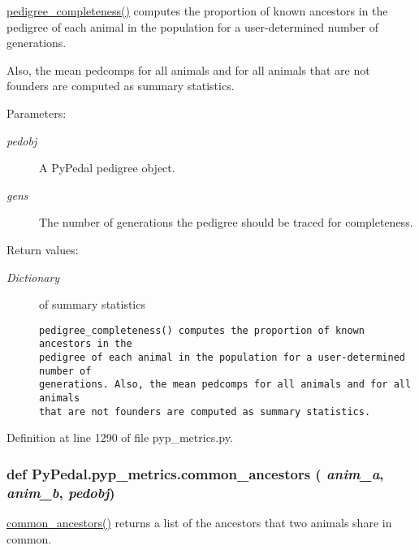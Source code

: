 \hyperlink{namespacePyPedal_1_1pyp__metrics_9839b790d3161aaf080c649adcdaff26}{pedigree\_\-completeness()} computes the proportion of known ancestors in the pedigree of each animal in the population for a user-determined number of generations. 

Also, the mean pedcomps for all animals and for all animals that are not founders are computed as summary statistics. \begin{Desc}
\item[Parameters:]
\begin{description}
\item[{\em pedobj}]A Py\-Pedal pedigree object. \item[{\em gens}]The number of generations the pedigree should be traced for completeness. \end{description}
\end{Desc}
\begin{Desc}
\item[Return values:]
\begin{description}
\item[{\em Dictionary}]of summary statistics

\footnotesize\begin{verbatim}pedigree_completeness() computes the proportion of known ancestors in the
pedigree of each animal in the population for a user-determined number of
generations. Also, the mean pedcomps for all animals and for all animals
that are not founders are computed as summary statistics.
\end{verbatim}
\normalsize
 \end{description}
\end{Desc}


Definition at line 1290 of file pyp\_\-metrics.py.\hypertarget{namespacePyPedal_1_1pyp__metrics_43a82ce2cfd34b53ddf6d29c4671d480}{
\subsubsection[common\_\-ancestors]{\setlength{\rightskip}{0pt plus 5cm}def Py\-Pedal.pyp\_\-metrics.common\_\-ancestors ( {\em anim\_\-a},  {\em anim\_\-b},  {\em pedobj})}}
\label{namespacePyPedal_1_1pyp__metrics_43a82ce2cfd34b53ddf6d29c4671d480}


\hyperlink{namespacePyPedal_1_1pyp__metrics_43a82ce2cfd34b53ddf6d29c4671d480}{common\_\-ancestors()} returns a list of the ancestors that two animals share in common. 

